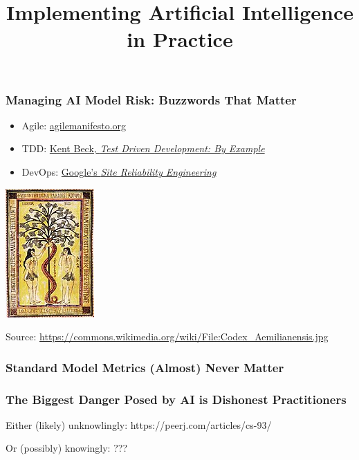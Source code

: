 

\title{Implementing Artificial Intelligence in Practice}

\maketitle

\begin{frame}
\frametitle{Managing AI Model Risk: Buzzwords That Matter}
\begin{itemize}
\item Agile: \href{https://agilemanifesto.org/}{agilemanifesto.org}
\item TDD: \href{https://www.oreilly.com/library/view/test-driven-development/0321146530/}{Kent Beck, {\it Test Driven Development: By Example}}
\item DevOps: \href{https://landing.google.com/sre/books/}{Google's {\it Site Reliability Engineering}}
\end{itemize}
\begin{center}
\includegraphics[height=0.35\textheight]{figures/Codex_Aemilianensis}
\end{center}
Source: \url{https://commons.wikimedia.org/wiki/File:Codex_Aemilianensis.jpg}
\end{frame}

\begin{frame}
\frametitle{Standard Model Metrics (Almost) Never Matter}
\end{frame}

\begin{frame}
\frametitle{The Biggest Danger Posed by AI is Dishonest Practitioners}
Either (likely) unknowlingly: https://peerj.com/articles/cs-93/

Or (possibly) knowingly: ???
\end{frame}


